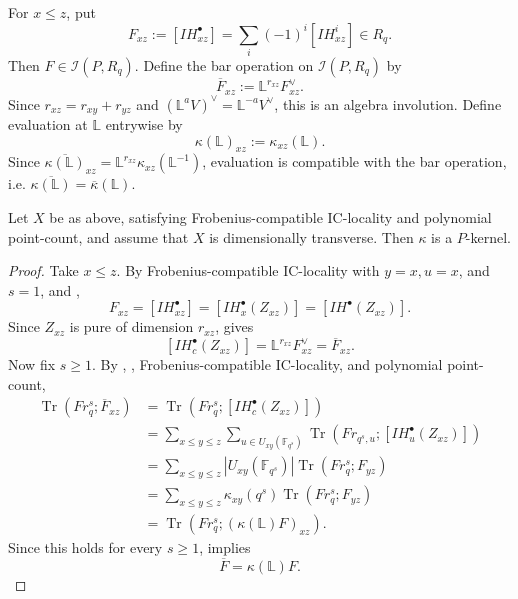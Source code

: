 \documentclass[a4paper]{article}
\newcommand\LL{{\mathbb{L}}}
\newcommand\II{{\mathcal{I}}}
\newcommand\Fqs{{\mathbb{F}_{q^s}}}
\begin{document}
For $x\leq z$, put
\[
        F_{xz}:=[IH_{xz}^\bullet]
        =\sum_i(-1)^i[IH_{xz}^i]\in R_q.
\]
Then $F\in\II(P,R_q)$. Define the bar operation on $\II(P,R_q)$ by
\[
        \overline{F}_{xz}:=\LL^{r_{xz}}F_{xz}^\vee.
\]
Since $r_{xz}=r_{xy}+r_{yz}$ and $(\LL^aV)^\vee=\LL^{-a}V^\vee$, this is an algebra involution.
Define evaluation at $\LL$ entrywise by
\[
        \kappa(\LL)_{xz}:=\kappa_{xz}(\LL).
\]
Since $\overline{\kappa(\LL)}_{xz}=\LL^{r_{xz}}\kappa_{xz}(\LL^{-1})$, 
evaluation is compatible with the bar operation, i.e. $\overline{\kappa(\LL)}=\overline{\kappa}(\LL)$.

\begin{theorem}[thm:]{}
        Let $X$ be as above, satisfying Frobenius-compatible IC-locality and polynomial point-count, and assume that $X$ is dimensionally transverse. Then $\kappa$ is a $P$-kernel.
        \begin{proof}
                Take $x\leq z$. By Frobenius-compatible IC-locality with $y=x,u=x$, and $s=1$, and ,
                \[
                        F_{xz}=[IH_{xz}^\bullet]=[IH_x^\bullet(Z_{xz})]=[IH^\bullet(Z_{xz})].
                \]
                Since $Z_{xz}$ is pure of dimension $r_{xz}$,  gives
                \[
                        [IH_c^\bullet(Z_{xz})]=\LL^{r_{xz}}F_{xz}^\vee=\overline{F}_{xz}.
                \]
                Now fix $s\geq 1$. By , , Frobenius-compatible IC-locality, and polynomial point-count,
                \begin{align*}
                        \operatorname{Tr}(Fr_q^s;\overline{F}_{xz})
                        &=\operatorname{Tr}(Fr_q^s;[IH_c^\bullet(Z_{xz})])\\
                        &=\sum_{x\leq y\leq z}\sum_{u\in U_{xy}(\Fqs)}
                        \operatorname{Tr}\!\left(Fr_{q^s,u};[IH_u^\bullet(Z_{xz})]\right)\\
                        &=\sum_{x\leq y\leq z}|U_{xy}(\Fqs)|\operatorname{Tr}(Fr_q^s;F_{yz})\\
                        &=\sum_{x\leq y\leq z}\kappa_{xy}(q^s)\operatorname{Tr}(Fr_q^s;F_{yz})\\
                        &=\operatorname{Tr}\!\left(Fr_q^s;(\kappa(\LL)F)_{xz}\right).
                \end{align*}
                Since this holds for every $s\geq 1$,  implies
                \[
                        \overline{F}=\kappa(\LL)F.
\]
\end{proof}
\end{theorem}
\end{document}
